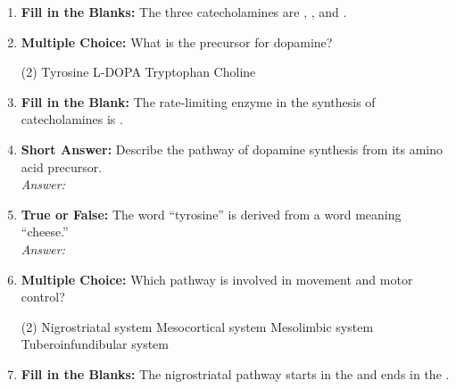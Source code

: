 \begin{enumerate}[label=\textbf{Q3.5.\arabic*}]
    \item \textbf{Fill in the Blanks:} The three catecholamines are \underline{\hspace{3cm}}, \underline{\hspace{3cm}}, and \underline{\hspace{3cm}}.

    \item \textbf{Multiple Choice:} What is the precursor for dopamine?
        \begin{tasks}[label=\textcolor{\documentTheme}{(\Alph*)}, item-format=\color{\documentTheme}, label-width=1.5em, item-indent=1.7em](2)
            \task Tyrosine
            \task L-DOPA
            \task Tryptophan
            \task Choline
        \end{tasks}

    \item \textbf{Fill in the Blank:} The rate-limiting enzyme in the synthesis of catecholamines is \underline{\hspace{3cm}}.

    \item \textbf{Short Answer:} Describe the pathway of dopamine synthesis from its amino acid precursor. \\
        \textit{Answer:} %

    \item \textbf{True or False:} The word ``tyrosine'' is derived from a word meaning ``cheese.'' \\
        \textit{Answer:} %

    \item \textbf{Multiple Choice:} Which pathway is involved in movement and motor control?
        \begin{tasks}[label=\textcolor{\documentTheme}{(\Alph*)}, item-format=\color{\documentTheme}, label-width=1.5em, item-indent=1.7em](2)
            \task Nigrostriatal system
            \task Mesocortical system
            \task Mesolimbic system
            \task Tuberoinfundibular system
        \end{tasks}

    \item \textbf{Fill in the Blanks:} The nigrostriatal pathway starts in the \underline{\hspace{3cm}} and ends in the \underline{\hspace{3cm}}.


\end{enumerate}
